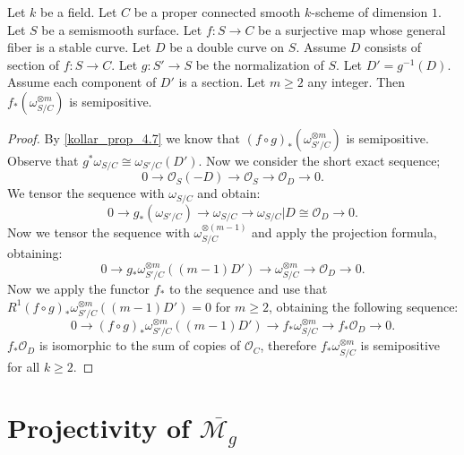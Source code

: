 \begin{lemma}[cf.\ {\cite[Theorem 4.9]{Ko90}}]
\label{kollar-theorem-4.9}
Let $k$ be a field.
Let $C$ be a proper connected smooth $k$-scheme of dimension $1$.
Let $S$ be a semismooth surface.
Let $f:S\to C$ be a surjective map whose general fiber is a stable curve.
Let $D$ be a double curve on $S$.
Assume $D$ consists of section of $f:S\to C$.
Let $g:S'\to S$ be the normalization of $S$.
Let $D'=g^{-1}(D)$.
Assume each component of $D'$ is a section.
Let $m\geq 2$ any integer.
Then $f_*(\omega_{S/C}^{\otimes m})$ is semipositive.
\end{lemma}
\begin{proof}
By \ref{kollar_prop_4.7} we know that $(f\circ g)_*(\omega_{S'/C}^{\otimes m})$ is semipositive.
Observe that $g^*\omega_{S/C}\cong \omega_{S'/C}(D')$.
Now we consider the short exact sequence;
$$0\to\mathcal{O}_{S}(-D)\to\mathcal{O}_S\to\mathcal{O}_D\to 0.$$
We tensor the sequence with $\omega_{S/C}$ and obtain:
$$0\to g_*(\omega_{S'/C})\to \omega_{S/C}\to \omega_{S/C}|D\cong \mathcal{O}_D\to 0.$$
Now we tensor the sequence with $\omega_{S/C}^{\otimes (m-1)}$ and apply the projection formula, obtaining:
$$0\to g_*\omega_{S'/C}^{\otimes m}((m-1)D')\to \omega_{S/C}^{\otimes m}\to \mathcal{O}_D\to 0.$$
 Now we apply the functor $f_*$ to the sequence and use that $R^1(f\circ g)_*\omega_{S'/C}^{\otimes m}((m-1)D')=0$ for $m\geq 2$, obtaining the following sequence:
 $$0\to (f\circ g)_*\omega_{S'/C}^{\otimes m}((m-1)D')\to f_*\omega_{S/C}^{\otimes m}\to f_*\mathcal{O}_D\to 0.$$
 $f_*\mathcal{O}_D$ is isomorphic to the sum of copies of $\mathcal{O}_C$, therefore $f_*\omega_{S/C}^{\otimes m}$ is semipositive for all $k\geq 2$. 
\end{proof}

\section{Projectivity of $\overline{\mathcal{M}_g}$}

